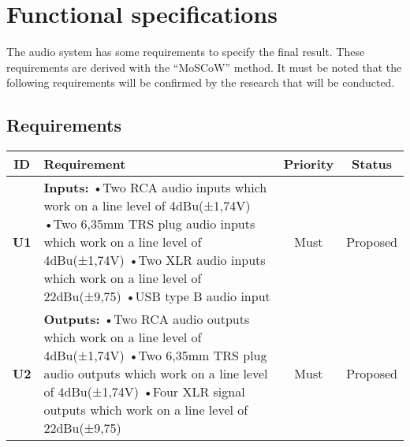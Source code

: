 \section{Functional specifications}

The audio system has some requirements to specify the final result. These requirements are derived with the “MoSCoW” method. It must be noted that the following requirements will be confirmed by the research that will be conducted.

	\newpage
	\subsection{Requirements}
	\begin{longtable}{|c|p{10cm}|c|c|}
		\hline
		\textbf{ID} & \textbf{Requirement} & \textbf{Priority} & \textbf{Status}\\ \hline 
		\textbf{U1} & \textbf{Inputs:} \newline
		•Two RCA audio inputs which work on a line level of 4dBu(±1,74V)\newline
		•Two 6,35mm TRS plug audio inputs which work on a line level of 4dBu(±1,74V)\newline
		•Two XLR audio inputs which work on a line level of 22dBu(±9,75)\newline
		•USB type B audio input & Must & Proposed\\ \hline

		\textbf{U2} & \textbf{Outputs:} \newline
		•Two RCA audio outputs which work on a line level of 4dBu(±1,74V)\newline
		•Two 6,35mm TRS plug audio outputs which work on a line level of 4dBu(±1,74V)\newline
		•Four XLR signal outputs which work on a line level of 22dBu(±9,75)
		 & Must & Proposed\\ \hline


\end{longtable}

